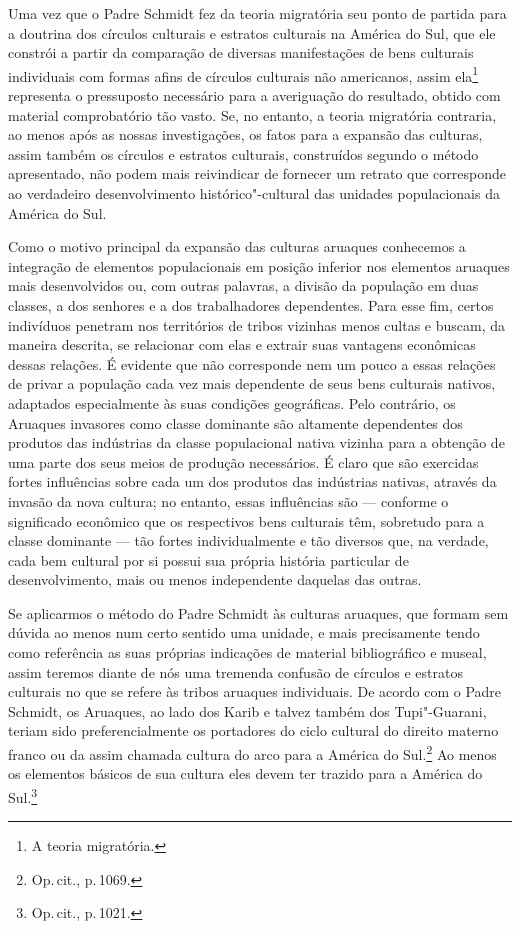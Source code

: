 Uma vez que o Padre Schmidt fez da teoria migratória seu ponto de
partida para a doutrina dos círculos culturais e estratos culturais na
América do Sul, que ele constrói a partir da comparação de diversas
manifestações de bens culturais individuais com formas afins de
círculos culturais não americanos, assim ela\footnote{A teoria migratória.}
representa o pressuposto necessário para a averiguação do resultado,
obtido com material comprobatório tão vasto. Se, no entanto, a teoria
migratória contraria, ao menos após as nossas investigações, os fatos
para a expansão das culturas, assim também os círculos e
estratos culturais, construídos segundo o método apresentado, não podem
mais reivindicar de fornecer um retrato que corresponde ao verdadeiro
desenvolvimento histórico"-cultural das unidades populacionais da América
do Sul.

Como o motivo principal da expansão das culturas aruaques conhecemos a
integração de elementos populacionais em posição inferior nos elementos
aruaques mais desenvolvidos ou, com outras palavras, a divisão da
população em duas classes, a dos senhores e a dos trabalhadores
dependentes. Para esse fim, certos indivíduos penetram nos territórios
de tribos vizinhas menos cultas e buscam, da maneira descrita, se
relacionar com elas e extrair suas vantagens econômicas dessas relações.
É evidente que não corresponde nem um pouco a essas relações de privar
a população cada vez mais dependente de seus bens culturais nativos,
adaptados especialmente às suas condições geográficas. Pelo contrário,
os Aruaques invasores como classe dominante são altamente dependentes
dos produtos das indústrias da classe populacional nativa vizinha para
a obtenção de uma parte dos seus meios de produção necessários. É claro
que são exercidas fortes influências sobre cada um dos produtos das
indústrias nativas, através da invasão da nova cultura; no entanto,
essas influências são --- conforme o significado econômico que os
respectivos bens culturais têm, sobretudo para a classe dominante --- tão
fortes individualmente e tão diversos que, na verdade, cada bem cultural
por si possui sua própria história particular de desenvolvimento, mais
ou menos independente daquelas das outras.

Se aplicarmos o método do Padre Schmidt às culturas aruaques, que formam
sem dúvida ao menos num certo sentido uma unidade, e mais precisamente
tendo como referência as suas próprias indicações de material
bibliográfico e museal, assim teremos diante de nós uma tremenda
confusão de círculos e estratos culturais no que se refere às tribos
aruaques individuais. De acordo com o Padre Schmidt, os Aruaques, ao lado
dos Karib e talvez também dos Tupi"-Guarani, teriam sido
preferencialmente os portadores do ciclo cultural do direito materno
franco ou da assim
chamada cultura do arco para a América do Sul.\footnote{Op.\,cit., p.\,1069.} Ao menos os elementos básicos de sua cultura eles devem ter
trazido para a América do Sul.\footnote{Op.\,cit., p.\,1021.}

